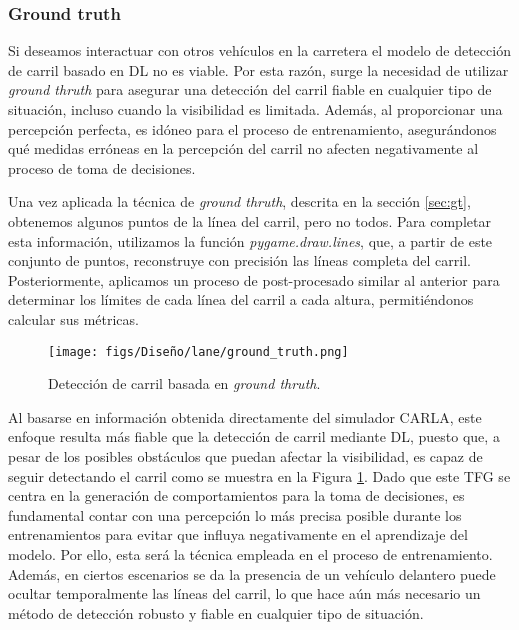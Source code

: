 \subsubsection{Ground truth}

Si deseamos interactuar con otros vehículos en la carretera el modelo de detección de carril basado en \ac{DL} no es viable. Por esta razón, surge la necesidad de utilizar \textit{ground thruth} para asegurar una detección del carril fiable en cualquier tipo de situación, incluso cuando la visibilidad es limitada. Además, al proporcionar una percepción perfecta, es idóneo para el proceso de entrenamiento, asegurándonos qué medidas erróneas en la percepción del carril no afecten negativamente al proceso de toma de decisiones. 

Una vez aplicada la técnica de \textit{ground thruth}, descrita en la sección \ref{sec:gt}, obtenemos algunos puntos de la línea del carril, pero no todos. Para completar esta información, utilizamos la función \textit{pygame.draw.lines}, que, a partir de este conjunto de puntos, reconstruye con precisión las líneas completa del carril. Posteriormente, aplicamos un proceso de post-procesado similar al anterior para determinar los límites de cada línea del carril a cada altura, permitiéndonos calcular sus métricas.

\begin{figure}[ht]
\centering
\texttt{[image: figs/Diseño/lane/ground\_truth.png]}
\caption{Detección de carril basada en \textit{ground thruth}.}
\label{fig:gt_final_carril}
\end{figure}

\newpage

Al basarse en información obtenida directamente del simulador CARLA, este enfoque resulta más fiable que la detección de carril mediante \ac{DL}, puesto que, a pesar de los posibles obstáculos que puedan afectar la visibilidad, es capaz de seguir detectando el carril como se muestra en la Figura \ref{fig:gt_final_carril}. Dado que este \ac{TFG} se centra en la generación de comportamientos para la toma de decisiones, es fundamental contar con una percepción lo más precisa posible durante los entrenamientos para evitar que influya negativamente en el aprendizaje del modelo. Por ello, esta será la técnica empleada en el proceso de entrenamiento. Además, en ciertos escenarios se da la presencia de un vehículo delantero puede ocultar temporalmente las líneas del carril, lo que hace aún más necesario un método de detección robusto y fiable en cualquier tipo de situación.

